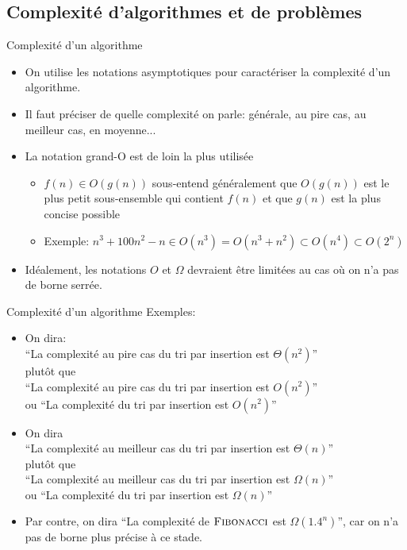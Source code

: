 \subsection{Complexité d'algorithmes et de problèmes}

\begin{frame}{Complexité d'un algorithme}
\begin{itemize}
\item On utilise les notations asymptotiques pour caractériser la
  \alert{complexité} d'un algorithme.
\item Il faut préciser de quelle complexité on parle: générale, au
  pire cas, au meilleur cas, en moyenne...
\item La notation grand-O est de loin la plus utilisée
\begin{itemize}
\item $f(n)\in O(g(n))$ sous-entend généralement que $O(g(n))$ est le
  plus petit sous-ensemble qui contient $f(n)$ et que $g(n)$ est la plus concise possible
\item Exemple: $n^3+100n^2-n \in O(n^3)=O(n^3+n^2)\subset O(n^4) \subset O(2^n)$
\end{itemize}
\item Idéalement, les notations $O$ et $\Omega$ devraient être
  limitées au cas où on n'a pas de borne serrée.
\end{itemize}
\end{frame}

\begin{frame}{Complexité d'un algorithme}
Exemples:
\begin{itemize}
\item On dira:\\
``La complexité au pire cas du tri par insertion est $\Theta(n^2)$''\\
plutôt que\\
``La complexité au pire cas du tri par insertion est $O(n^2)$'' \\
ou ``La complexité du tri par insertion est $O(n^2)$''
\item On dira\\
``La complexité au meilleur cas du tri par insertion est $\Theta(n)$''\\
plutôt que\\
``La complexité au meilleur cas du tri par insertion est $\Omega(n)$''\\
ou ``La complexité du tri par insertion est $\Omega(n)$''
\item Par contre, on dira ``La complexité de $\textnormal{\scshape Fibonacci}$ est $\Omega(1.4^n)$'', car on n'a pas de borne plus précise à ce stade.
\end{itemize}
\end{frame}

